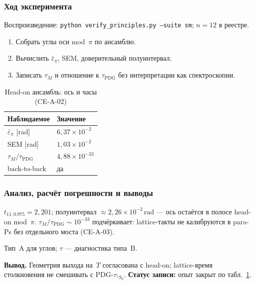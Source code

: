 \subsubsection*{Ход эксперимента}
Воспроизведение: \texttt{python verify\_principles.py --suite sm}; $n=12$ в реестре.

\begin{enumerate}[label=\textbf{Шаг \arabic*:},leftmargin=*,itemsep=0.35em]
\item Собрать углы оси mod~$\pi$ по ансамблю.
\item Вычислить $\bar\varepsilon_\pi$, SEM, доверительный полуинтервал.
\item Записать $\tau_M$ и отношение к $\tau_{\mathrm{PDG}}$ без интерпретации как спектроскопии.
\end{enumerate}

\begin{table}[htbp]
\centering
\small
\caption{Head-on ансамбль: ось и часы (CE-A-02)}
\label{tab:exp-ce-a-02}
\begin{tabular}{@{}ll@{}}
\toprule
Наблюдаемое & Значение \\
\midrule
$\bar\varepsilon_\pi$ [rad] & $6{,}37\times 10^{-2}$ \\
SEM [rad] & $1{,}03\times 10^{-2}$ \\
$\tau_M/\tau_{\mathrm{PDG}}$ & $4{,}88\times 10^{-33}$ \\
back-to-back & да \\
\bottomrule
\end{tabular}
\end{table}

\subsubsection*{Анализ, расчёт погрешности и выводы}
$t_{11,0.975}=2{,}201$; полуинтервал $\approx 2{,}26\times 10^{-2}\,\mathrm{rad}$ --- ось остаётся в полосе head-on mod~$\pi$.
$\tau_M/\tau_{\mathrm{PDG}}\sim 10^{-33}$ подчёркивает: lattice-такты не калибруются в para-Ps без отдельного моста (CE-A-03).

Тип~A для углов; $\tau$ --- диагностика типа~B.

\textbf{Вывод.}
Геометрия выхода на~$T$ согласована с head-on; lattice-время столкновения не смешивать с PDG-$\tau_{^1S_0}$.
\textbf{Статус записи:} опыт закрыт по табл.~\ref{tab:exp-ce-a-02}.
